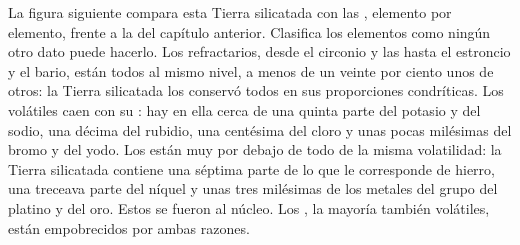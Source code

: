 La figura siguiente compara esta Tierra silicatada con las , elemento por
elemento, frente a la  del capítulo anterior. Clasifica
los elementos como ningún otro dato puede hacerlo. Los 
refractarios, desde el circonio y las  hasta el estroncio y el bario, están todos
al mismo nivel, a menos de un veinte por ciento unos de otros: la Tierra silicatada
los conservó todos en sus proporciones condríticas. Los  volátiles
caen con su : hay en ella cerca de una quinta parte del potasio
y del sodio, una décima del rubidio, una centésima del cloro y unas pocas
milésimas del bromo y del yodo. Los  están muy por debajo de todo 
de la misma volatilidad: la Tierra silicatada contiene una séptima parte de lo que le corresponde de
hierro, una treceava parte del níquel y unas tres milésimas de los
metales del grupo del platino y del oro. Estos se fueron al núcleo. Los ,
la mayoría también volátiles, están empobrecidos por ambas razones.

